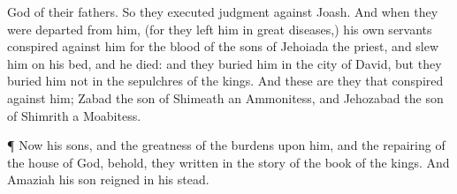 {God of their
fathers. So they
executed
judgment against
Joash.
And when they were
departed from him, (for they
left him in
great
diseases,) his own
servants
conspired against him for the
blood of the
sons of
Jehoiada the
priest, and
slew him on his
bed, and he
died: and they
buried him in the
city of
David, but they
buried him not in the
sepulchres of the
kings.
And these are they that
conspired against him;
Zabad the
son of
Shimeath an
Ammonitess, and
Jehozabad the
son of
Shimrith a
Moabitess.
\par }{\PP {}¶ Now
{} his
sons, and the
greatness of the
burdens
{} upon him, and the
repairing of the
house of
God, behold, they
{}
written in the
story of the
book of the
kings. And
Amaziah his
son
reigned in his stead.

}
